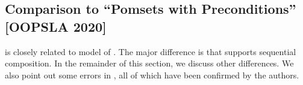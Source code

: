 







\subsection{Comparison to ``Pomsets with Preconditions'' [OOPSLA 2020]}
\label{sec:diff}

\PwTmca{} is closely related to \PwP{} model of
\citep{DBLP:journals/pacmpl/JagadeesanJR20}.  The major difference is that
\PwTmca{} supports sequential composition.  In the remainder of this section,
we discuss other differences.  We also point out some errors in
\cite{DBLP:journals/pacmpl/JagadeesanJR20}, all of which have been confirmed
by the authors.


